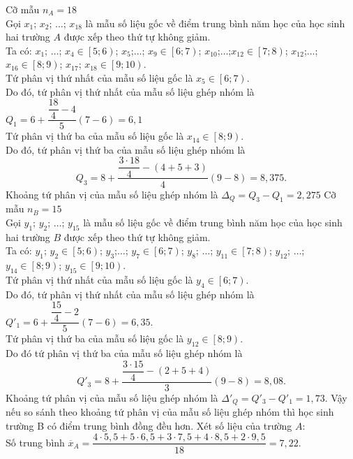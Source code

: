 \begin{ex}
{\begin{itemchoice}
			\itemch Cỡ mẫu $n_A=18$\\ 
			Gọi $x_1$; $x_2$; $\ldots$; $x_{18}$ là  mẫu số liệu gốc về điểm trung bình năm học của học sinh hai trường $A$ được xếp theo thứ tự không giảm.\\
			Ta có: $x_1$; $\ldots$; $x_4\in\left[5;6\right)$; $x_5$;$\ldots$; $x_9\in\left[6;7\right)$; $x_{10}$;$\ldots$;$x_{12}\in\left[7;8\right)$; $x_{12}$;$\ldots$;$x_{16}\in\left[8;9\right)$; $x_{17}$; $x_{18}\in\left[9;10\right)$.\\ 
			Tứ phân vị thứ nhất của mẫu số liệu gốc là  $x_5\in\left[6;7\right)$.\\
			Do đó, tứ phân vị thứ nhất của mẫu  số liệu ghép nhóm là $Q_1=6+\dfrac{\dfrac{18}{4}-4}{5}\left(7-6\right)=6{,}1$\\
			Tứ phân vị thứ ba của  mẫu số liệu gốc là $x_{14}\in\left[8;9\right)$.\\
			Do đó, tứ phân  vị thứ ba của mẫu số liệu ghép nhóm là $$Q_3=8+\dfrac{\dfrac{3\cdot 18}{4}-\left(4+5+3\right)}{4}\left(9-8\right)=8{,}375.$$
			Khoảng tứ phân vị  của mẫu số liệu ghép nhóm là $\Delta_Q=Q_3-Q_1=2{,}275$
			 \itemch Cỡ mẫu $n_B=15$\\
			Gọi $y_1$; $y_2$; $\ldots$; $y_{15}$ là mẫu số liệu gốc về điểm trung  bình năm học của học sinh hai trường $B$ được xếp theo thứ tự không giảm.\\
			Ta có: $y_1$; $y_2\in\left[5;6\right)$;  $y_3$;$\ldots$; $y_7\in\left[6;7\right)$; $y_8$; $\ldots$; $y_{11}\in\left[7;8\right)$; $y_{12}$; $\ldots$; $y_{14}\in\left[8;9\right)$; $y_{15}\in\left[9;10\right)$.\\
			Tứ phân vị thứ nhất của mẫu số liệu gốc là $y_4\in\left[6;7\right)$.\\ 
			Do đó, tứ phân vị thứ nhất  của mẫu số liệu ghép nhóm là $Q'_1=6+\dfrac{\dfrac{15}{4}-2}{5}\left(7-6\right)=6{,}35$.\\
			Tứ phân vị thứ ba của mẫu số liệu  gốc là $y_{12}\in\left[8;9\right)$.\\
			Do đó  tứ phân vị thứ ba của mẫu số liệu ghép nhóm là $$Q'_3=8+\dfrac{\dfrac{3\cdot 15}{4}-\left(2+5+4\right)}{3}\left(9-8\right)=8{,}08.$$
			Khoảng tứ phân vị  của mẫu số liệu ghép nhóm là $\Delta'_Q=Q'_3-Q'_1=1{,}73$.
			\itemch Vậy nếu so sánh theo khoảng  tứ phân vị của mẫu số liệu ghép nhóm thì học sinh trường B có điểm trung bình đồng đều hơn.
			\itemch Xét số  liệu của trường $A$:\\
			 Số trung bình $\overline{x}_A=\dfrac{4\cdot 5{,}5+5\cdot 6{,}5+3\cdot 7{,}5+4\cdot 8{,}5+2\cdot 9{,}5}{18}=7{,}22$.\\

\end{itemchoice}}
\end{ex}
